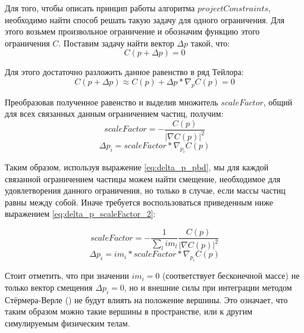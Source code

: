 	Для того, чтобы описать принцип работы алгоритма $projectConstraints$, необходимо найти способ решать такую задачу для одного ограничения. Для этого возьмем произвольное ограничение и обозначим функцию этого ограничения $C$. Поставим задачу найти вектор $\Delta p$ такой, что:
	\begin{equation}
		C(p + \Delta p) = 0
	\end{equation}
	
	Для этого достаточно разложить данное равенство в ряд Тейлора:
	\begin{equation}
		C(p + \Delta p) \approx C(p) + \Delta p * \nabla_{p} C(p) = 0
	\end{equation}
	
	Преобразовав полученное равенство и выделив множитель $scaleFactor$, общий для всех связанных данным ограничением частиц, получим:
	\begin{equation} \label{eq:delta_p_scaleFactor}
		scaleFactor = -\frac{C(p)}{|\nabla C(p)|^2}
	\end{equation}
	\begin{equation} \label{eq:delta_p_pbd}
		\Delta p_i = scaleFactor* \nabla_{p_i} C(p)
	\end{equation}
	
	Таким образом, используя выражение \ref{eq:delta_p_pbd}, мы для каждой связанной ограничением частицы можем найти смещение, необходимое для удовлетворения данного ограничения, но только в случае, если массы частиц равны между собой. Иначе требуется воспользоваться приведенным ниже выражением \ref{eq:delta_p_scaleFactor_2}:
	
	\begin{equation} \label{eq:delta_p_scaleFactor_2}
		scaleFactor = -\frac{1}{\sum_l im_l} \frac{C(p)}{|\nabla C(p)|^2}
	\end{equation}
	\begin{equation} \label{eq:delta_p_pbd_2}
		\Delta p_i = im_i * scaleFactor * \nabla_{p_i} C(p)
	\end{equation}

	Стоит отметить, что при значении $im_i = 0$ (соответствует бесконечной массе) не только вектор смещения $\Delta p_i = 0$, но и внешние силы при интеграции методом Стёрмера-Верле () не будут влиять на положение вершины. Это означает, что таким образом можно  такие вершины в пространстве, или  к другим симулируемым физическим телам.
	
